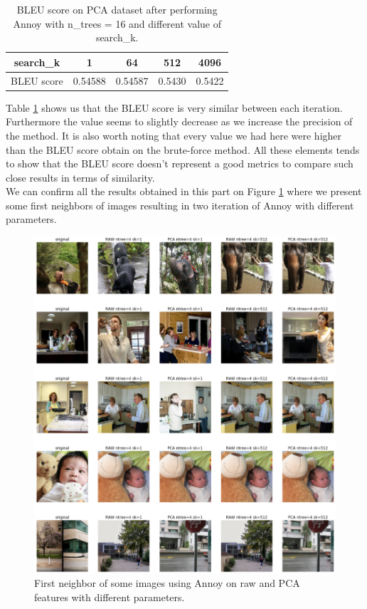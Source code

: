 \documentclass[a4paper]{article}
\begin{document}
	\begin{table}[h]
		\centering
		\begin{tabular}{ | c | c | c | c | c |}
		\hline
			search\_k & 1 & 64 & 512 & 4096 \\ \hline
			BLEU score & 0.54588 & 0.54587 & 0.5430 & 0.5422 \\ \hline
			
		\end{tabular}
		\caption{BLEU score on PCA dataset after performing Annoy with n\_trees = 16 and different value of search\_k.}
		\label{table:bleu-annoy}
	\end{table}
	
Table \ref{table:bleu-annoy} shows us that the BLEU score is very similar between each iteration. Furthermore the value seems to slightly decrease as we increase the precision of the method. It is also worth noting that every value we had here were higher than the BLEU score obtain on the brute-force method. All these elements tends to show that the BLEU score doesn't represent a good metrics to compare such close results in terms of similarity.\\


We can confirm all the results obtained in this part on Figure \ref{fig:visual-annoy} where we present some first neighbors of images resulting in two iteration of Annoy with different parameters.\\

\begin{figure}[h]
	\includegraphics[width=\textwidth]{visual-annoy}
	\caption{First neighbor of some images using Annoy on raw and PCA features with different parameters.}
	\label{fig:visual-annoy}
\end{figure}
\end{document}
